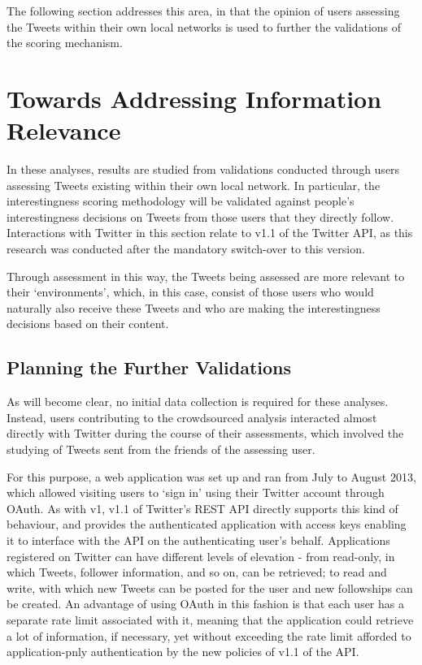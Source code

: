 The following section addresses this area, in that the opinion of users assessing the Tweets within their own local networks is used to further the validations of the scoring mechanism. 


\section{Towards Addressing Information Relevance}
In these analyses, results are studied from validations conducted through users assessing Tweets existing within their own local network. In particular, the interestingness scoring methodology will be validated against people's interestingness decisions on Tweets from those users that they directly follow. Interactions with Twitter in this section relate to v1.1 of the Twitter API, as this research was conducted after the mandatory switch-over to this version.

Through assessment in this way, the Tweets being assessed are more relevant to their `environments', which, in this case, consist of those users who would naturally also receive these Tweets and who are making the interestingness decisions based on their content.


\subsection{Planning the Further Validations}
As will become clear, no initial data collection is required for these analyses. Instead, users contributing to the crowdsourced analysis interacted almost directly with Twitter during the course of their assessments, which involved the studying of Tweets sent from the friends of the assessing user.

For this purpose, a web application was set up and ran from July to August 2013, which allowed visiting users to `sign in' using their Twitter account through OAuth. As with v1, v1.1 of Twitter's REST API directly supports this kind of behaviour, and provides the authenticated application with access keys enabling it to interface with the API on the authenticating user's behalf. Applications registered on Twitter can have different levels of elevation - from read-only, in which Tweets, follower information, and so on, can be retrieved; to read and write, with which new Tweets can be posted for the user and new followships can be created. An advantage of using OAuth in this fashion is that each user has a separate rate limit associated with it, meaning that the application could retrieve a lot of information, if necessary, yet without exceeding the rate limit afforded to application-pnly authentication by the new policies of v1.1 of the API.

